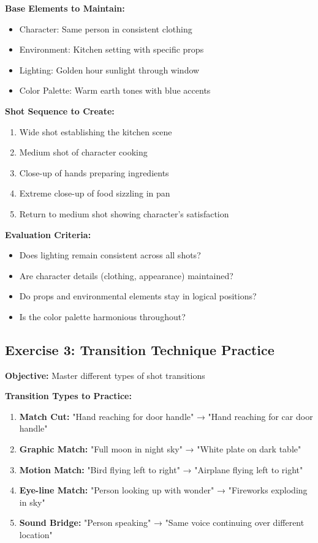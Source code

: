 \textbf{Base Elements to Maintain:}
\begin{itemize}
\item Character: Same person in consistent clothing
\item Environment: Kitchen setting with specific props
\item Lighting: Golden hour sunlight through window
\item Color Palette: Warm earth tones with blue accents
\end{itemize}

\textbf{Shot Sequence to Create:}
\begin{enumerate}
\item Wide shot establishing the kitchen scene
\item Medium shot of character cooking
\item Close-up of hands preparing ingredients
\item Extreme close-up of food sizzling in pan
\item Return to medium shot showing character's satisfaction
\end{enumerate}

\textbf{Evaluation Criteria:}
\begin{itemize}
\item Does lighting remain consistent across all shots?
\item Are character details (clothing, appearance) maintained?
\item Do props and environmental elements stay in logical positions?
\item Is the color palette harmonious throughout?
\end{itemize}

\subsection*{Exercise 3: Transition Technique Practice}
\textbf{Objective:} Master different types of shot transitions

\textbf{Transition Types to Practice:}
\begin{enumerate}
\item \textbf{Match Cut:} "Hand reaching for door handle" → "Hand reaching for car door handle"
\item \textbf{Graphic Match:} "Full moon in night sky" → "White plate on dark table"
\item \textbf{Motion Match:} "Bird flying left to right" → "Airplane flying left to right"
\item \textbf{Eye-line Match:} "Person looking up with wonder" → "Fireworks exploding in sky"
\item \textbf{Sound Bridge:} "Person speaking" → "Same voice continuing over different location"
\end{enumerate}

